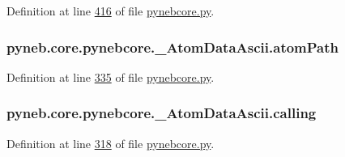 Definition at line \hyperlink{pynebcore_8py_source_l00416}{416} of file \hyperlink{pynebcore_8py_source}{pynebcore.\-py}.

\hypertarget{classpyneb_1_1core_1_1pynebcore_1_1___atom_data_ascii_ae16a1eb022aac82bfee45f425a21ed90}{
\subsubsection[{atom\-Path}]{\setlength{\rightskip}{0pt plus 5cm}pyneb.\-core.\-pynebcore.\-\_\-\-Atom\-Data\-Ascii.\-atom\-Path}}\label{classpyneb_1_1core_1_1pynebcore_1_1___atom_data_ascii_ae16a1eb022aac82bfee45f425a21ed90}


Definition at line \hyperlink{pynebcore_8py_source_l00335}{335} of file \hyperlink{pynebcore_8py_source}{pynebcore.\-py}.

\hypertarget{classpyneb_1_1core_1_1pynebcore_1_1___atom_data_ascii_af5c364ae799620ff1af6870cf78ae19b}{
\subsubsection[{calling}]{\setlength{\rightskip}{0pt plus 5cm}pyneb.\-core.\-pynebcore.\-\_\-\-Atom\-Data\-Ascii.\-calling}}\label{classpyneb_1_1core_1_1pynebcore_1_1___atom_data_ascii_af5c364ae799620ff1af6870cf78ae19b}


Definition at line \hyperlink{pynebcore_8py_source_l00318}{318} of file \hyperlink{pynebcore_8py_source}{pynebcore.\-py}.



